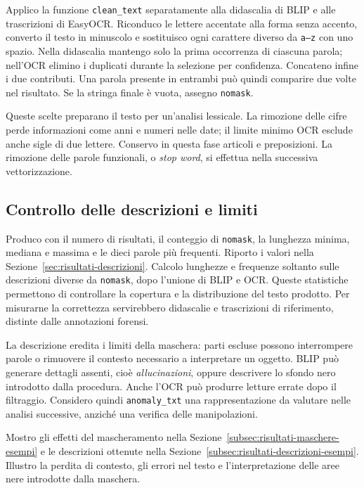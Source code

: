 Applico la funzione \texttt{clean\_text} separatamente alla didascalia di BLIP e alle trascrizioni di EasyOCR. Riconduco le lettere accentate alla forma senza accento, converto il testo in minuscolo e sostituisco ogni carattere diverso da \texttt{a--z} con uno spazio. Nella didascalia mantengo solo la prima occorrenza di ciascuna parola; nell'OCR elimino i duplicati durante la selezione per confidenza. Concateno infine i due contributi. Una parola presente in entrambi può quindi comparire due volte nel risultato. Se la stringa finale è vuota, assegno \texttt{nomask}.

Queste scelte preparano il testo per un'analisi lessicale. La rimozione delle cifre perde informazioni come anni e numeri nelle date; il limite minimo OCR esclude anche sigle di due lettere. Conservo in questa fase articoli e preposizioni. La rimozione delle parole funzionali, o \emph{stop word}, si effettua nella successiva vettorizzazione.

\subsection{Controllo delle descrizioni e limiti}
\label{subsec:metodi-descrizioni-controllo}

Produco  con il numero di risultati, il conteggio di \texttt{nomask}, la lunghezza minima, mediana e massima e le dieci parole più frequenti. Riporto i valori nella Sezione~\ref{sec:risultati-descrizioni}. Calcolo lunghezze e frequenze soltanto sulle descrizioni diverse da \texttt{nomask}, dopo l'unione di BLIP e OCR. Queste statistiche permettono di controllare la copertura e la distribuzione del testo prodotto. Per misurarne la correttezza servirebbero didascalie e trascrizioni di riferimento, distinte dalle annotazioni forensi.

La descrizione eredita i limiti della maschera: parti escluse possono interrompere parole o rimuovere il contesto necessario a interpretare un oggetto. BLIP può generare dettagli assenti, cioè \emph{allucinazioni}, oppure descrivere lo sfondo nero introdotto dalla procedura. Anche l'OCR può produrre letture errate dopo il filtraggio. Considero quindi \texttt{anomaly\_txt} una rappresentazione da valutare nelle analisi successive, anziché una verifica delle manipolazioni.

Mostro gli effetti del mascheramento nella Sezione~\ref{subsec:risultati-maschere-esempi} e le descrizioni ottenute nella Sezione~\ref{subsec:risultati-descrizioni-esempi}. Illustro la perdita di contesto, gli errori nel testo e l'interpretazione delle aree nere introdotte dalla maschera.
